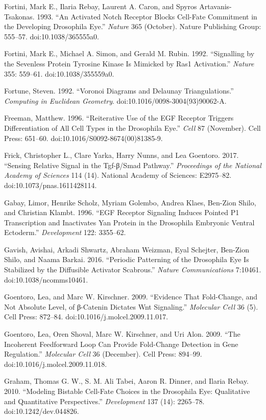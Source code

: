 Fortini, Mark E., Ilaria Rebay, Laurent A. Caron, and Spyros Artavanis-Tsakonas. 1993. ``An Activated Notch Receptor Blocks Cell-Fate Commitment in the Developing Drosophila Eye.'' \emph{Nature} 365 (October). Nature Publishing Group: 555--57. doi:10.1038/365555a0.

Fortini, Mark E., Michael A. Simon, and Gerald M. Rubin. 1992. ``Signalling by the Sevenless Protein Tyrosine Kinase Is Mimicked by Ras1 Activation.'' \emph{Nature} 355: 559--61. doi:10.1038/355559a0.

Fortune, Steven. 1992. ``Voronoi Diagrams and Delaunay Triangulations.'' \emph{Computing in Euclidean Geometry}. doi:10.1016/0098-3004(93)90062-A.

Freeman, Matthew. 1996. ``Reiterative Use of the EGF Receptor Triggers Differentiation of All Cell Types in the Drosophila Eye.'' \emph{Cell} 87 (November). Cell Press: 651--60. doi:10.1016/S0092-8674(00)81385-9.

Frick, Christopher L., Clare Yarka, Harry Nunns, and Lea Goentoro. 2017. ``Sensing Relative Signal in the Tgf-β/Smad Pathway.'' \emph{Proceedings of the National Academy of Sciences} 114 (14). National Academy of Sciences: E2975--82. doi:10.1073/pnas.1611428114.

Gabay, Limor, Henrike Scholz, Myriam Golembo, Andrea Klaes, Ben-Zion Shilo, and Christian Klambt. 1996. ``EGF Receptor Signaling Induces Pointed P1 Transcription and Inactivates Yan Protein in the Drosophila Embryonic Ventral Ectoderm.'' \emph{Development} 122: 3355--62.

Gavish, Avishai, Arkadi Shwartz, Abraham Weizman, Eyal Schejter, Ben-Zion Shilo, and Naama Barkai. 2016. ``Periodic Patterning of the Drosophila Eye Is Stabilized by the Diffusible Activator Scabrous.'' \emph{Nature Communications} 7:10461. doi:10.1038/ncomms10461.

Goentoro, Lea, and Marc W. Kirschner. 2009. ``Evidence That Fold-Change, and Not Absolute Level, of β-Catenin Dictates Wnt Signaling.'' \emph{Molecular Cell} 36 (5). Cell Press: 872--84. doi:10.1016/j.molcel.2009.11.017.

Goentoro, Lea, Oren Shoval, Marc W. Kirschner, and Uri Alon. 2009. ``The Incoherent Feedforward Loop Can Provide Fold-Change Detection in Gene Regulation.'' \emph{Molecular Cell} 36 (December). Cell Press: 894--99. doi:10.1016/j.molcel.2009.11.018.

Graham, Thomas G. W., S. M. Ali Tabei, Aaron R. Dinner, and Ilaria Rebay. 2010. ``Modeling Bistable Cell-Fate Choices in the Drosophila Eye: Qualitative and Quantitative Perspectives.'' \emph{Development} 137 (14): 2265--78. doi:10.1242/dev.044826.

